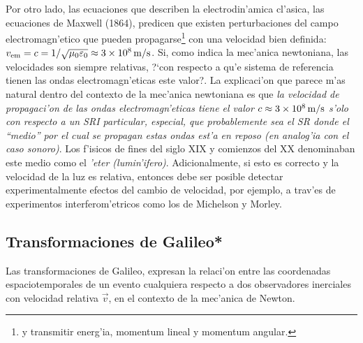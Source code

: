 Por otro lado, las ecuaciones que describen la electrodin'amica cl'asica,  las ecuaciones de Maxwell (1864), predicen que existen perturbaciones del campo electromagn'etico que pueden propagarse\footnote{y transmitir energ'ia, momentum lineal y momentum angular.} con una velocidad bien definida: $v_{\rm em}=c ={1}/{\sqrt{\mu_0\varepsilon_0}}\approx 3\times 10^{8}\,\rm m/s$. Si, como indica la mec'anica newtoniana, las velocidades son siempre relativas, ?`con respecto a qu'e sistema de referencia tienen las ondas electromagn'eticas este valor?. La explicaci'on que parece m'as natural dentro del contexto de la mec'anica newtoniana es que \textit{la velocidad de
propagaci'on de las ondas electromagn'eticas tiene el valor $c\approx 3\times 10^{8}\,\rm m/s$ s'olo con respecto a un SRI particular, especial, que probablemente sea el SR donde el ``medio'' por el cual se propagan estas ondas est'a en reposo (en analog'ia con el caso sonoro)}. Los f'isicos de fines del siglo XIX y comienzos del XX denominaban este medio como el \textit{'eter  (lumin'ifero)}. Adicionalmente, si esto es correcto y la velocidad de la luz es relativa, entonces debe ser posible detectar experimentalmente efectos del cambio de velocidad, por ejemplo, a trav'es de experimentos interferom'etricos como los de Michelson y Morley.

\subsection{Transformaciones de Galileo*}
Las transformaciones de Galileo, expresan la relaci'on entre las coordenadas espaciotemporales de un evento cualquiera respecto a dos observadores inerciales con velocidad relativa $\vec{v}$, en el contexto de la mec'anica de Newton.

